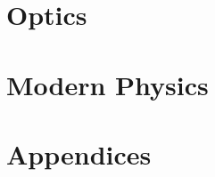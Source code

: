 \documentclass[oneside]{book}
\theoremstyle{definition}
\begin{document}
\part{Optics}





\part{Modern Physics}









\backmatter

\appendix 
\part{Appendices}



\printindex
\end{document}

